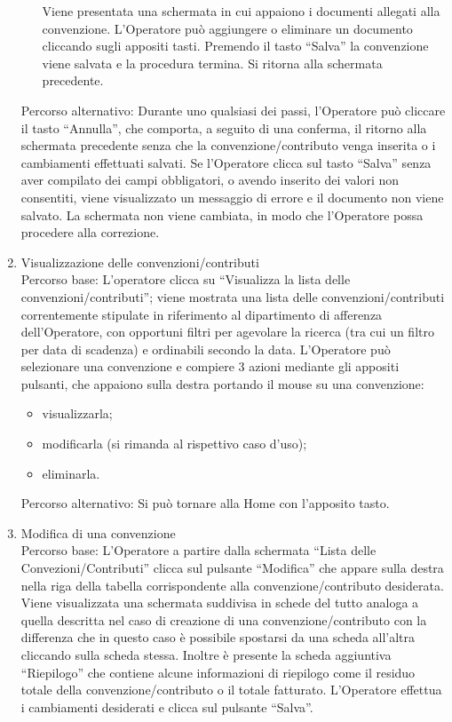 \begin{enumerate}
\begin{enumerate}
	  Viene presentata una schermata in cui appaiono i documenti allegati alla convenzione. L'Operatore può aggiungere o eliminare un documento 
	  cliccando sugli appositi tasti. Premendo il tasto ``Salva'' la convenzione viene salvata e la procedura termina. Si ritorna alla schermata precedente.
  \end{enumerate}
		 
  Percorso alternativo:
  Durante uno qualsiasi dei passi, l'Operatore può cliccare il tasto ``Annulla'', che comporta, a seguito di una conferma, il ritorno alla schermata precedente
  senza che la convenzione/contributo venga inserita o i cambiamenti effettuati salvati.
  Se l'Operatore clicca sul tasto ``Salva'' senza aver compilato dei campi obbligatori, o avendo inserito dei valori non consentiti, viene visualizzato un messaggio di errore 
  e il documento non viene salvato. La schermata non viene cambiata, in modo che l'Operatore possa procedere alla correzione.
     
  \item Visualizzazione delle convenzioni/contributi\\

  Percorso base:
  L'operatore clicca su ``Visualizza la lista delle convenzioni/contributi''; viene mostrata una lista delle convenzioni/contributi correntemente stipulate in 
  riferimento al dipartimento di afferenza dell'Operatore, con opportuni filtri 
  per agevolare la ricerca (tra cui un filtro per data di scadenza) e ordinabili secondo la data.
  L'Operatore può selezionare una convenzione e compiere 3 azioni mediante gli appositi pulsanti, che appaiono sulla destra portando il mouse su 
  una convenzione:
  \begin{itemize}
   \item visualizzarla;
   \item modificarla (si rimanda al rispettivo caso d'uso);
   \item eliminarla.
  \end{itemize}		

  Percorso alternativo:
  Si può tornare alla Home con l'apposito tasto.
 
  \item Modifica di una convenzione\\
  
  Percorso base:
  L'Operatore a partire dalla schermata ``Lista delle Convezioni/Contributi'' clicca sul pulsante ``Modifica'' che appare sulla destra nella riga 
  della tabella corrispondente alla convenzione/contributo desiderata. Viene visualizzata una schermata suddivisa in schede del tutto analoga a quella
  descritta nel caso di creazione di una convenzione/contributo con la differenza che in questo caso è possibile spostarsi da una scheda all'altra
  cliccando sulla scheda stessa. Inoltre è presente la scheda aggiuntiva ``Riepilogo'' che contiene alcune informazioni di riepilogo come il residuo
  totale della convenzione/contributo o il totale fatturato.
  L'Operatore effettua i cambiamenti desiderati e clicca sul pulsante ``Salva''.\\


\end{enumerate}
